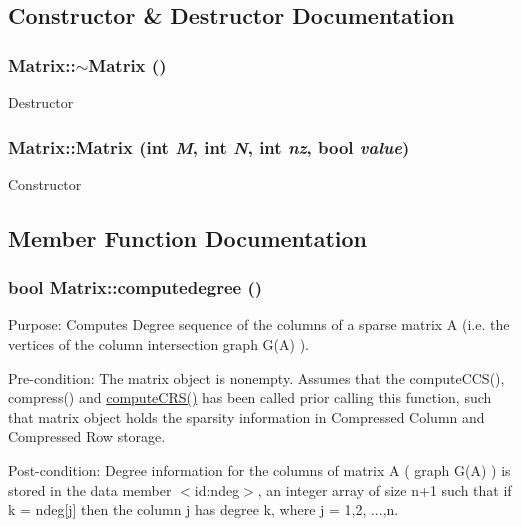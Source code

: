 \subsection{Constructor \& Destructor Documentation}
\hypertarget{classMatrix_a9b1c3627f573d78a2f08623fdfef990f}{
\subsubsection[{$\sim$Matrix}]{\setlength{\rightskip}{0pt plus 5cm}Matrix::$\sim$Matrix ()}}
\label{classMatrix_a9b1c3627f573d78a2f08623fdfef990f}
Destructor \hypertarget{classMatrix_ae1ee0790f74689ac1ea9d6493e5ccd60}{
\subsubsection[{Matrix}]{\setlength{\rightskip}{0pt plus 5cm}Matrix::Matrix (int {\em M}, \/  int {\em N}, \/  int {\em nz}, \/  bool {\em value})}}
\label{classMatrix_ae1ee0790f74689ac1ea9d6493e5ccd60}
Constructor 

\subsection{Member Function Documentation}
\hypertarget{classMatrix_a6f6be59bfe0d4d5e1efae38f22174482}{
\subsubsection[{computedegree}]{\setlength{\rightskip}{0pt plus 5cm}bool Matrix::computedegree ()}}
\label{classMatrix_a6f6be59bfe0d4d5e1efae38f22174482}
Purpose: Computes Degree sequence of the columns of a sparse matrix A (i.e. the vertices of the column intersection graph G(A) ).

Pre-\/condition: The matrix object is nonempty. Assumes that the computeCCS(), compress() and \hyperlink{classIRowColumnDS_ab93c5ed2748d15f61ac047a033e0deca}{computeCRS()} has been called prior calling this function, such that matrix object holds the sparsity information in Compressed Column and Compressed Row storage.

Post-\/condition: Degree information for the columns of matrix A ( graph G(A) ) is stored in the data member $<$id:ndeg$>$, an integer array of size n+1 such that if k = ndeg\mbox{[}j\mbox{]} then the column j has degree k, where j = 1,2, ...,n.

